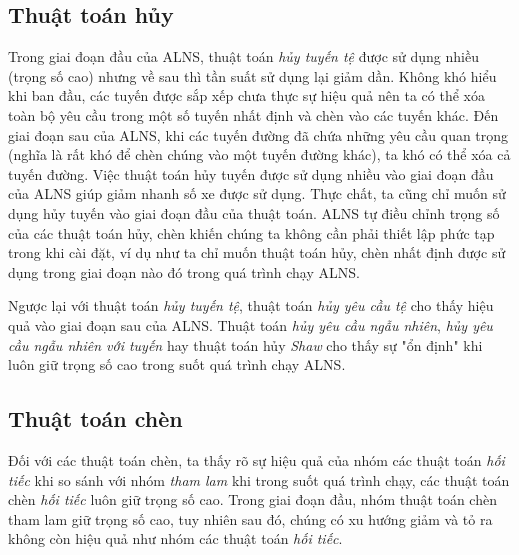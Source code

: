 \subsection*{Thuật toán hủy}
Trong giai đoạn đầu của ALNS, thuật toán \textit{hủy tuyến tệ} được sử dụng nhiều (trọng số cao) nhưng về sau thì tần suất sử dụng lại giảm dần. Không khó hiểu khi ban đầu, các tuyến được sắp xếp chưa thực sự hiệu quả nên ta có thể xóa toàn bộ yêu cầu trong một số tuyến nhất định và chèn vào các tuyến khác. Đến giai đoạn sau của ALNS, khi các tuyến đường đã chứa những yêu cầu quan trọng (nghĩa là rất khó để chèn chúng vào một tuyến đường khác), ta khó có thể xóa cả tuyến đường. Việc thuật toán hủy tuyến được sử dụng nhiều vào giai đoạn đầu của ALNS giúp giảm nhanh số xe được sử dụng. Thực chất, ta cũng chỉ muốn sử dụng hủy tuyến vào giai đoạn đầu của thuật toán. ALNS tự điều chỉnh trọng số của các thuật toán hủy, chèn khiến chúng ta không cần phải thiết lập phức tạp trong khi cài đặt, ví dụ như ta chỉ muốn thuật toán hủy, chèn nhất định được sử dụng trong giai đoạn nào đó trong quá trình chạy ALNS. 

Ngược lại với thuật toán \textit{hủy tuyến tệ}, thuật toán \textit{hủy yêu cầu tệ} cho thấy hiệu quả vào giai đoạn sau của ALNS. Thuật toán \textit{hủy yêu cầu ngẫu nhiên}, \textit{hủy yêu cầu ngẫu nhiên với tuyến} hay thuật toán hủy \textit{Shaw} cho thấy sự "ổn định" khi luôn giữ trọng số cao trong suốt quá trình chạy ALNS.

\subsection*{Thuật toán chèn}
Đối với các thuật toán chèn, ta thấy rõ sự hiệu quả của nhóm các thuật toán \textit{hối tiếc} khi so sánh với nhóm \textit{tham lam} khi trong suốt quá trình chạy, các thuật toán chèn \textit{hối tiếc} luôn giữ trọng số cao. Trong giai đoạn đầu, nhóm thuật toán chèn tham lam giữ trọng số cao, tuy nhiên sau đó, chúng có xu hướng giảm và tỏ ra không còn hiệu quả như nhóm các thuật toán \textit{hối tiếc}.